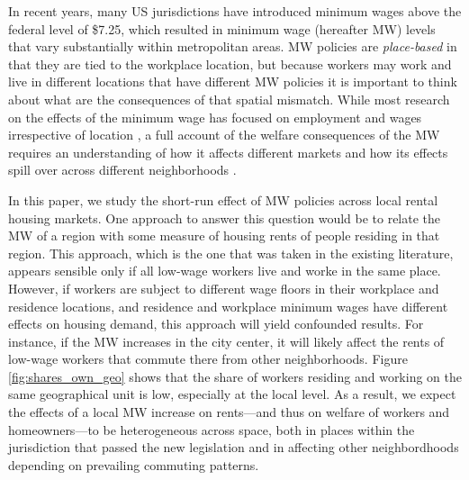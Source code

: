 

In recent years, many US jurisdictions have introduced minimum wages above the 
federal level of \$7.25, which resulted in minimum wage (hereafter MW) levels that
vary substantially within metropolitan areas. 
MW policies are \textit{place-based} in that they are tied to the workplace location, 
but because workers may work and live in different locations that have different 
MW policies it is important to think about what are the consequences of that spatial 
mismatch.
While most research on the effects of the minimum wage has focused on employment 
and wages irrespective of location 
\parencite[e.g.,][]{CardKrueger1994, AutorEtAl2016, CegnizEtAl2019}, 
a full account of the welfare consequences of the MW requires an 
understanding of how it affects different markets and how its effects spill over 
across different neighborhoods
\parencite[as recently emphasized by][]{DubeLindner2021}.

In this paper, we study the short-run effect of MW policies across local rental 
housing markets.
One approach to answer this question would be to relate the MW of a region with 
some measure of housing rents of people residing in that region.
This approach, which is the one that was taken in the existing literature, appears 
sensible only if all low-wage workers live and worke in the same place.
However, if workers are subject to different wage floors in their workplace and
residence locations, and residence and workplace minimum wages have different 
effects on housing demand, this approach will yield confounded results.
For instance, if the MW increases in the city center, it will likely affect the 
rents of low-wage workers that commute there from other neighborhoods.
Figure \ref{fig:shares_own_geo} shows that the share of workers residing and 
working on the same geographical unit is low, especially at the local level.
As a result, we expect the effects of a local MW increase on rents---and thus on 
welfare of workers and homeowners---to be heterogeneous across space, both in 
places within the jurisdiction that passed the new legislation and in affecting
other neighbordhoods depending on prevailing commuting patterns.

